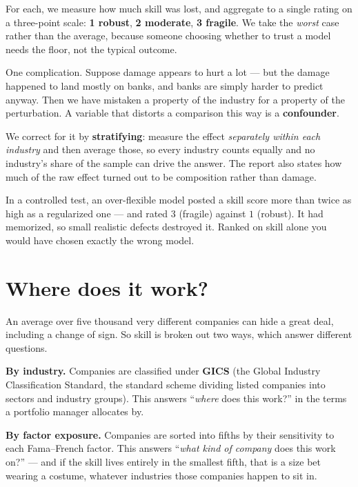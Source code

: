\documentclass[11pt]{article}
\begin{document}
For each, we measure how much skill was lost, and aggregate to a single rating on a
three-point scale: \textbf{1 robust}, \textbf{2 moderate}, \textbf{3 fragile}. We take
the \emph{worst} case rather than the average, because someone choosing whether to
trust a model needs the floor, not the typical outcome.

\begin{specbox}
One complication. Suppose damage appears to hurt a lot --- but the damage happened to
land mostly on banks, and banks are simply harder to predict anyway. Then we have
mistaken a property of the industry for a property of the perturbation. A variable that
distorts a comparison this way is a \textbf{confounder}.

We correct for it by \textbf{stratifying}: measure the effect \emph{separately within
each industry} and then average those, so every industry counts equally and no industry's
share of the sample can drive the answer. The report also states how much of the raw
effect turned out to be composition rather than damage.
\end{specbox}

\begin{keybox}
In a controlled test, an over-flexible model posted a skill score more than twice as
high as a regularized one --- and rated $3$ (fragile) against $1$ (robust). It had
memorized, so small realistic defects destroyed it. Ranked on skill alone you would
have chosen exactly the wrong model.
\end{keybox}

\section{Where does it work?}

An average over five thousand very different companies can hide a great deal,
including a change of sign. So skill is broken out two ways, which answer different
questions.

\textbf{By industry.} Companies are classified under \textbf{GICS} (the Global Industry
Classification Standard, the standard scheme dividing listed companies into sectors and
industry groups). This answers ``\emph{where} does this work?'' in the terms a portfolio
manager allocates by.

\textbf{By factor exposure.} Companies are sorted into fifths by their sensitivity to
each Fama--French factor. This answers ``\emph{what kind of company} does this work
on?'' --- and if the skill lives entirely in the smallest fifth, that is a size bet
wearing a costume, whatever industries those companies happen to sit in.
\end{document}
